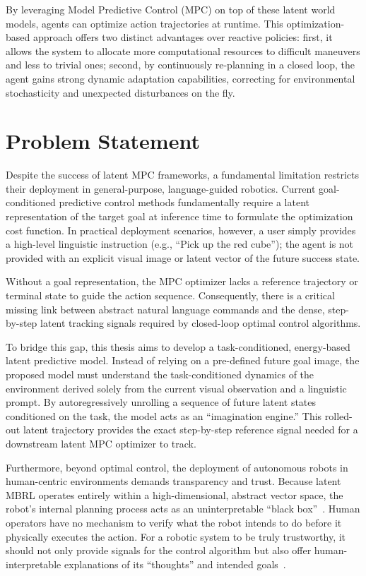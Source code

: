 By leveraging Model Predictive Control (MPC) on top of these latent world models, agents can optimize action trajectories at runtime. This optimization-based approach offers two distinct advantages over reactive policies: first, it allows the system to allocate more computational resources to difficult maneuvers and less to trivial ones; second, by continuously re-planning in a closed loop, the agent gains strong dynamic adaptation capabilities, correcting for environmental stochasticity and unexpected disturbances on the fly.

\section{Problem Statement}
\label{sec:intro_prob_stmt}

Despite the success of latent MPC frameworks, a fundamental limitation restricts their deployment in general-purpose, language-guided robotics. Current goal-conditioned predictive control methods fundamentally require a latent representation of the target goal at inference time to formulate the optimization cost function. In practical deployment scenarios, however, a user simply provides a high-level linguistic instruction (e.g., ``Pick up the red cube''); the agent is not provided with an explicit visual image or latent vector of the future success state.

Without a goal representation, the MPC optimizer lacks a reference trajectory or terminal state to guide the action sequence. Consequently, there is a critical missing link between abstract natural language commands and the dense, step-by-step latent tracking signals required by closed-loop optimal control algorithms.

To bridge this gap, this thesis aims to develop a task-conditioned, energy-based latent predictive model. Instead of relying on a pre-defined future goal image, the proposed model must understand the task-conditioned dynamics of the environment derived solely from the current visual observation and a linguistic prompt. By autoregressively unrolling a sequence of future latent states conditioned on the task, the model acts as an ``imagination engine.'' This rolled-out latent trajectory provides the exact step-by-step reference signal needed for a downstream latent MPC optimizer to track.

Furthermore, beyond optimal control, the deployment of autonomous robots in human-centric environments demands transparency and trust. Because latent MBRL operates entirely within a high-dimensional, abstract vector space, the robot's internal planning process acts as an uninterpretable ``black box''~\cite{milani2024explainable}. Human operators have no mechanism to verify what the robot intends to do before it physically executes the action. For a robotic system to be truly trustworthy, it should not only provide signals for the control algorithm but also offer human-interpretable explanations of its ``thoughts'' and intended goals~\cite{tabrez2019explanation, ha2018worldmodels}.

